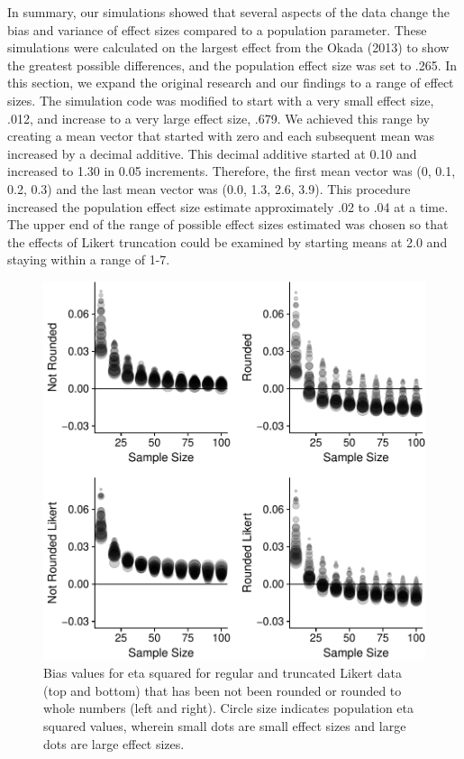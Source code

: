 \documentclass[english,man]{apa6}
\theoremstyle{definition}
\theoremstyle{definition}
\theoremstyle{definition}
\theoremstyle{remark}
\begin{document}
In summary, our simulations showed that several aspects of the data
change the bias and variance of effect sizes compared to a population
parameter. These simulations were calculated on the largest effect from
the Okada (2013) to show the greatest possible differences, and the
population effect size was set to .265. In this section, we expand the
original research and our findings to a range of effect sizes. The
simulation code was modified to start with a very small effect size,
.012, and increase to a very large effect size, .679. We achieved this
range by creating a mean vector that started with zero and each
subsequent mean was increased by a decimal additive. This decimal
additive started at 0.10 and increased to 1.30 in 0.05 increments.
Therefore, the first mean vector was (0, 0.1, 0.2, 0.3) and the last
mean vector was (0.0, 1.3, 2.6, 3.9). This procedure increased the
population effect size estimate approximately .02 to .04 at a time. The
upper end of the range of possible effect sizes estimated was chosen so
that the effects of Likert truncation could be examined by starting
means at 2.0 and staying within a range of 1-7.

\begin{figure}[htbp]
\centering
\includegraphics{buchanan_scofield_files/figure-latex/across-graph-bias-1.pdf}
\caption{\label{fig:across-graph-bias}Bias values for eta squared for
regular and truncated Likert data (top and bottom) that has been not
been rounded or rounded to whole numbers (left and right). Circle size
indicates population eta squared values, wherein small dots are small
effect sizes and large dots are large effect sizes.}
\end{figure}
\end{document}
